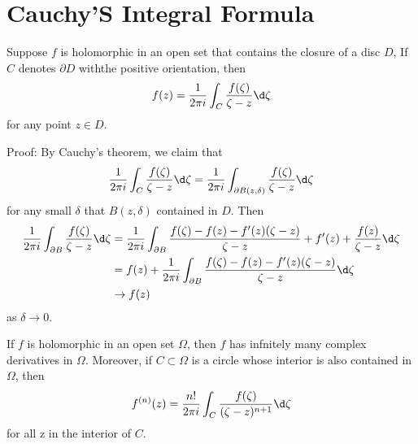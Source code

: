 \documentclass[12pt, oneside]{book}
\begin{document}
\section{Cauchy'S Integral Formula}
\begin{theorem}
    Suppose $f$ is holomorphic in an open set that contains the closure of a disc $D$, If $C$ denotes $\partial D$ withthe positive orientation, then
    $$
        f(z)=\frac{1}{2\pi i}\int_{C}\frac{f(\zeta)}{\zeta-z}\d \zeta
    $$
    for any point $z\in D$.

    Proof:
    By Cauchy's theorem, we claim that
    $$\frac{1}{2\pi i}\int_{C}\frac{f(\zeta)}{\zeta-z}\d \zeta=\frac{1}{2\pi i}\int_{\partial B(z,\delta)}\frac{f(\zeta)}{\zeta-z}\d \zeta$$
    for any small $\delta$ that $B(z,\delta)$ contained in $D$. Then
    $$\begin{aligned}
            \frac{1}{2\pi i}\int_{\partial B}\frac{f(\zeta)}{\zeta-z}\d \zeta & =\frac{1}{2\pi i}\int_{\partial B}\frac{f(\zeta)-f(z)-f'(z)(\zeta-z)}{\zeta-z}+f'(z)+\frac{f(z)}{\zeta-z}\d \zeta \\
                                                                              & =f(z)+\frac{1}{2\pi i}\int_{\partial B}\frac{f(\zeta)-f(z)-f'(z)(\zeta-z)}{\zeta-z}\d \zeta                       \\
                                                                              & \to f(z)
        \end{aligned}$$
    as $\delta\to 0$.
\end{theorem}
\begin{corollary}
    If $f$ is holomorphic in an open set $\Omega$, then $f$ has infnitely many complex derivatives in $\Omega$. Moreover, if $C\subset \Omega$ is a circle whose interior is also contained in $\Omega$, then
    $$f^{(n)}(z)=\frac{n!}{2\pi i}\int_C\frac{f(\zeta)}{(\zeta-z)^{n+1}}\d \zeta $$
    for all z in the interior of $C$.
\end{corollary}
\end{document}
